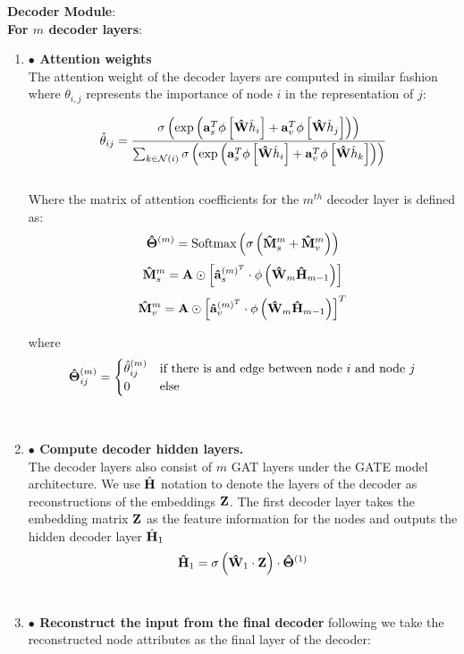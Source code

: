 \documentclass[a4paper,12pt]{article}
\newcommand{\forceindent}{\leavevmode{\parindent=2em\indent}}
\begin{document}
\begin{itemize}
\begin{enumerate}
{\begin{enumerate}
{					} 
			\end{enumerate}
			\forceindent \textbf{Decoder Module}: \\
			\forceindent \textbf{For $m$ decoder layers}:
			\begin{enumerate}
				\item[]{\textbf{$\bullet$ Attention weights} \\
					The attention weight of the decoder layers are computed in similar fashion where $\theta_{i,j}$ represents the importance of node $i$ in the representation of $j$:
					
					\[ \hat{\theta}_{ij} = \frac{\sigma\left(\exp\left({\bf a}_s^T\phi\left[{\bf \hat{W}}\hat{h}_i\right]+{\bf a}_v^T\phi\left[{\bf \hat{W}}\hat{h}_j \right]\right)\right)}
					{\sum_{k\in \mathcal{N}(i)}\sigma\left(\exp\left({\bf a}_s^T\phi\left[{\bf \hat{W}}\hat{h}_i\right]+{\bf a}_v^T\phi\left[{\bf \hat{W}}\hat{h}_k \right]\right)\right)} \]
					\\
					Where the matrix of attention coefficients for the $m^{th}$ decoder layer is defined as:
					\[{\bf \hat{\Theta}}^{(m)} = \text{Softmax}\left(\sigma\left({\bf \hat{M}}_s^{m} + {\bf \hat{M}}_v^{m}\right)\right) \]
					\[{\bf \hat{M}}_s^{m} = {\bf A}\odot \left[{\bf \hat{a}}_s^{(m)^T} \cdot \phi\left({\bf \hat{W}}_{m}{\bf \hat{H}}_{m-1}\right)\right]\]
					\[{\bf \hat{M}}_v^{m} = {\bf A}\odot \left[{\bf \hat{a}}_v^{(m)^T}\cdot \phi\left( {\bf \hat{W}}_{m}{\bf \hat{H}}_{m-1}\right)\right]^T\]
					
					where
					\[ {\bf \hat{\Theta}}_{ij}^{(m)} = \begin{cases} \hat{\theta}_{ij}^{(m)} & \text{if there is and edge between node $i$ and node $j$} \\ 0 & \text{else}\end{cases} \]
					}\\
				\item[]{\textbf{$\bullet$ Compute decoder hidden layers.}\\
					The decoder layers also consist of $m$ GAT layers under the GATE model architecture. We use $\hat{\bf H}$ notation to denote the layers of the decoder as reconstructions of the embeddings $\bf Z$. The first decoder layer takes the embedding matrix $\bf Z$ as the feature information for the nodes and outputs the hidden decoder layer $\hat{\bf H}_1$ 
					\[ {\bf \hat{H}}_{1} = \sigma\left({\bf \hat{W}}_{1}\cdot {\bf Z}\right)\cdot {\bf \hat{\Theta}}^{(1)}\]
				}\\
				\item[]{\textbf{$\bullet$ Reconstruct the input from the final decoder}
					following \cite{salehi2019graph} we take the reconstructed node attributes as the final layer of the decoder:
					
}
\end{enumerate}}
\end{enumerate}
\end{itemize}
\end{document}
